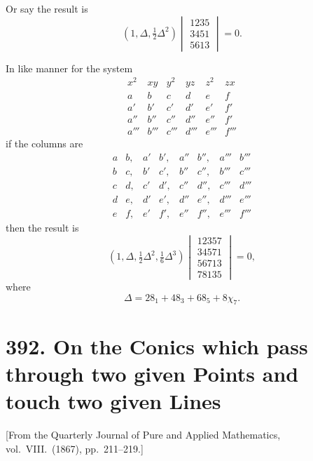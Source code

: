 \documentclass[12pt,a4paper]{article}
\theoremstyle{plain}
\theoremstyle{definition}
\theoremstyle{remark}
\begin{document}
\begin{enumerate}[label=\arabic*.]
Or say the result is
\[(1, \Delta, \tfrac{1}{2}\Delta^2)
\begin{vmatrix}
1235 \\
3451 \\
5613
\end{vmatrix} = 0.\]

In like manner for the system
\[\begin{matrix}
x^2 & xy & y^2 & yz & z^2 & zx \\
a & b & c & d & e & f \\
a' & b' & c' & d' & e' & f' \\
a'' & b'' & c'' & d'' & e'' & f' \\
a''' & b''' & c''' & d''' & e''' & f'''
\end{matrix}\]
if the columns are
\[\begin{matrix}
a & b, & a' & b', & a'' & b'', & a''' & b''' \\
b & c, & b' & c', & b'' & c'', & b''' & c''' \\
c & d, & c' & d', & c'' & d'', & c''' & d''' \\
d & e, & d' & e', & d'' & e'', & d''' & e''' \\
e & f, & e' & f', & e'' & f'', & e''' & f'''
\end{matrix}\]
then the result is
\[(1, \Delta, \tfrac{1}{2}\Delta^2, \tfrac{1}{6}\Delta^3)
\begin{vmatrix}
12357 \\
34571 \\
56713 \\
78135
\end{vmatrix} = 0,\]
where
\[\Delta = 28_1 + 48_3 + 68_5 + 8\chi_7.\]
\end{enumerate}



\section*{392. On the Conics which pass through two given Points and touch two given Lines}

\begin{center}
\small [From the Quarterly Journal of Pure and Applied Mathematics, vol.~VIII.\ (1867), pp.~211--219.]
\end{center}
\end{document}
